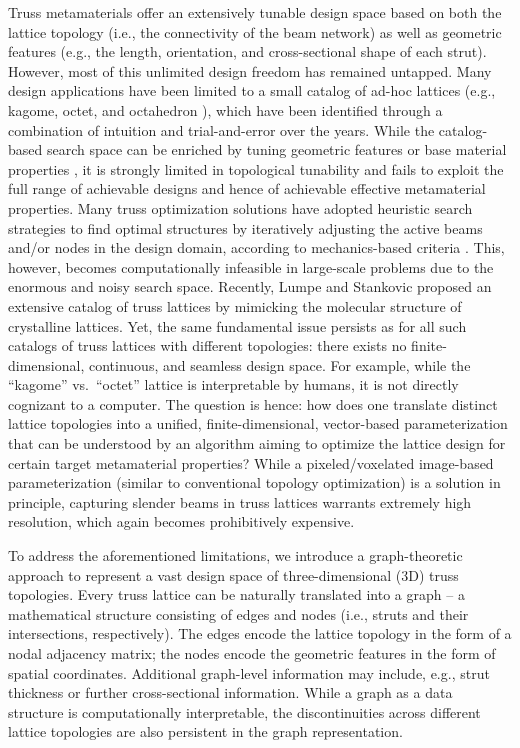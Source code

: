 \documentclass[fleqn,10pt]{wlscirep}
\begin{document}
Truss metamaterials offer an extensively tunable design space based on both the lattice topology (i.e., the connectivity of the beam network) as well as geometric features (e.g., the length, orientation, and cross-sectional shape of each strut). However, most of this unlimited design freedom has remained untapped. Many design applications\cite{sharpe2018design, tran2019constrained, watts2019simple, feng2021isotropic, wang2020deep} have been limited to a small catalog of ad-hoc lattices (e.g., kagome, octet, and octahedron \cite{zheng2014ultralight, schumacher2015microstructures, tancogne2018elastically, martinez2019star, jia2020engineering, zhang2021mechanical, zhang2022bamboo}), which have been identified through a combination of intuition and trial-and-error over the years. While the catalog-based search space can be enriched by tuning geometric features \cite{xu2016design} or base material properties \cite{watts2019simple}, it is strongly limited in topological tunability and fails to exploit the full range of achievable designs and hence of achievable effective metamaterial properties.  Many truss optimization solutions have adopted heuristic search strategies to find optimal structures by iteratively adjusting the active beams and/or nodes in the design domain, according to mechanics-based criteria \cite{nguyen2013heuristic, alzahrani2015design, chougrani2019parts,azizi2022shape}. This, however, becomes computationally infeasible in large-scale problems due to the enormous and noisy search space. Recently, Lumpe and Stankovic\cite{lumpe2021exploring} proposed an extensive catalog of truss lattices by mimicking the molecular structure of crystalline lattices. Yet, the same fundamental issue persists as for all such catalogs of truss lattices with different topologies: there exists no finite-dimensional, continuous, and seamless design space.  For example, while the ``kagome'' vs.\ ``octet'' lattice is interpretable by humans, it is not directly cognizant to a computer. The question is hence: how does one translate distinct lattice topologies into a unified, finite-dimensional, vector-based parameterization that can be understood by an algorithm aiming to optimize the lattice design for certain target metamaterial properties? While a pixeled/voxelated image-based parameterization (similar to conventional topology optimization) is a solution in principle, capturing slender beams in truss lattices warrants extremely high resolution, which again becomes prohibitively expensive.

To address the aforementioned limitations, we introduce a graph-theoretic approach to represent a vast design space of three-dimensional (3D) truss topologies. Every truss lattice can be naturally translated into a graph -- a mathematical structure consisting of edges and nodes (i.e., struts and their intersections, respectively). The edges encode the lattice topology in the form of a  nodal adjacency matrix; the nodes encode the geometric features in the form of spatial coordinates. Additional graph-level information may include, e.g., strut thickness or further cross-sectional information. While a graph as a data structure is computationally interpretable,  the discontinuities across different lattice topologies are also persistent in the graph representation. 
\end{document}
